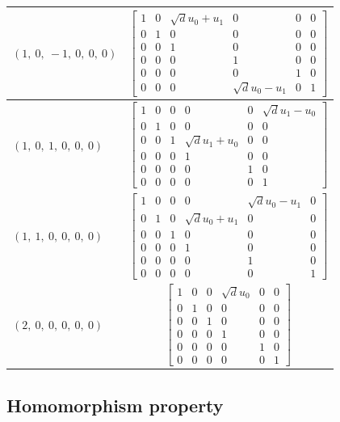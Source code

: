 \documentclass[11pt]{article}
\theoremstyle{definition}
\begin{document}
\begin{longtable}{|l|c|}
    \hline
    $\left( 1, \  0, \  -1, \  0, \  0, \  0\right)$ & ${\left[\begin{matrix}1 & 0 & \sqrt{d} u_{0} + u_{1} & 0 & 0 & 0\\0 & 1 & 0 & 0 & 0 & 0\\0 & 0 & 1 & 0 & 0 & 0\\0 & 0 & 0 & 1 & 0 & 0\\0 & 0 & 0 & 0 & 1 & 0\\0 & 0 & 0 & \sqrt{d} u_{0} - u_{1} & 0 & 1\end{matrix}\right]}$ \\
    \hline
    $\left( 1, \  0, \  1, \  0, \  0, \  0\right)$ & ${\left[\begin{matrix}1 & 0 & 0 & 0 & 0 & \sqrt{d} u_{1} - u_{0}\\0 & 1 & 0 & 0 & 0 & 0\\0 & 0 & 1 & \sqrt{d} u_{1} + u_{0} & 0 & 0\\0 & 0 & 0 & 1 & 0 & 0\\0 & 0 & 0 & 0 & 1 & 0\\0 & 0 & 0 & 0 & 0 & 1\end{matrix}\right]}$ \\
    \hline
    $\left( 1, \  1, \  0, \  0, \  0, \  0\right)$ & ${\left[\begin{matrix}1 & 0 & 0 & 0 & \sqrt{d} u_{0} - u_{1} & 0\\0 & 1 & 0 & \sqrt{d} u_{0} + u_{1} & 0 & 0\\0 & 0 & 1 & 0 & 0 & 0\\0 & 0 & 0 & 1 & 0 & 0\\0 & 0 & 0 & 0 & 1 & 0\\0 & 0 & 0 & 0 & 0 & 1\end{matrix}\right]}$ \\
    \hline
    $\left( 2, \  0, \  0, \  0, \  0, \  0\right)$ & ${\left[\begin{matrix}1 & 0 & 0 & \sqrt{d} u_{0} & 0 & 0\\0 & 1 & 0 & 0 & 0 & 0\\0 & 0 & 1 & 0 & 0 & 0\\0 & 0 & 0 & 1 & 0 & 0\\0 & 0 & 0 & 0 & 1 & 0\\0 & 0 & 0 & 0 & 0 & 1\end{matrix}\right]}$ \\
    \hline
\end{longtable}


\subsection{Homomorphism property}
\end{document}
